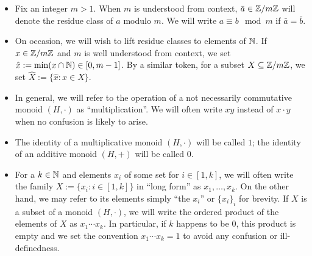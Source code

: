 \begin{itemize}
	\item Fix an integer $m>1$.  When $m$ is understood from context, $\bar{a} \in \mathbb{Z}/m\mathbb{Z}$ will denote the residue class of $a$ modulo $m$.
	We will write $a\equiv b \mod m$ if $\bar{a} = \bar{b}$.
	
	\item On occasion, we will wish to lift residue classes to elements of $\mathbb{N}$.  
	If $x\in \mathbb{Z}/m\mathbb{Z}$ and $m$ is well understood from context, we set $\hat{x} := \min(x\cap \mathbb{N}) \in [0,m-1]$.
	By a similar token, for a subset $X\subseteq \mathbb{Z}/m\mathbb{Z}$, we set $\hat{X} := \{\hat{x}: x\in X\}$.
	
	\item In general, we will refer to the operation of a not necessarily commutative monoid $(H,\cdot)$ as ``multiplication''.
	We will often write $xy$ instead of $x\cdot y$ when no confusion is likely to arise.
	
	\item The identity of a multiplicative monoid $(H,\cdot)$ will be called $1$; the identity of an additive monoid $(H,+)$ will be called $0$.
	
	\item For a $k\in \mathbb{N}$ and elements $x_i$ of some set for $i\in [1,k]$, we will often write the family $X:=\{x_i: i\in [1,k]\}$ in ``long form'' as $x_1,\dots,x_k$.
	On the other hand, we may refer to its elements simply ``the $x_i$'' or $\{x_i\}_i$ for brevity.
	If $X$ is a subset of a monoid $(H,\cdot)$, we will write the ordered product of the elements of $X$ as $x_1\cdots x_k$.
	In particular, if $k$ happens to be $0$, this product is empty and we set the convention $x_1\cdots x_k = 1$ to avoid any confusion or ill-definedness.
\end{itemize}




